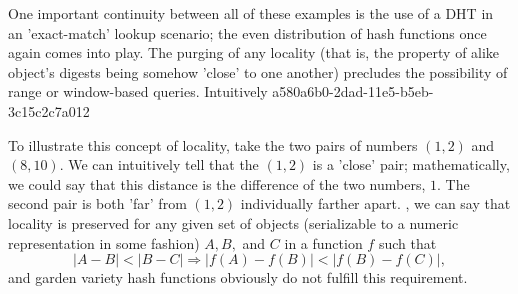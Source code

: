 \documentclass[12pt]{article}
\begin{document}
\par One important continuity between all of these examples is the use of a DHT in an 'exact-match' lookup scenario; the even distribution of hash functions once again comes into play. The purging of any locality (that is, the property of alike object's digests being somehow 'close' to one another) precludes the possibility of range or window-based queries. Intuitively
a580a6b0-2dad-11e5-b5eb-3c15c2c7a012
\par To illustrate this concept of locality, take the two pairs of numbers $(1,2)$ and $(8,10)$. We can intuitively tell that the $(1,2)$ is a 'close' pair; mathematically, we could say that this distance is the difference of the two numbers, $1$. The second pair is both 'far' from $(1,2)$ individually farther apart. , we can say that locality is preserved for any given set of objects (serializable to a numeric representation in some fashion) $A,B,$ and $C$ in a function $f$ such that
\begin{equation}
|A-B| < |B-C| \Rightarrow |f(A)-f(B)| < |f(B) - f(C)|,
\end{equation}
and garden variety hash functions obviously do not fulfill this requirement.

\printbibliography
\end{document}
